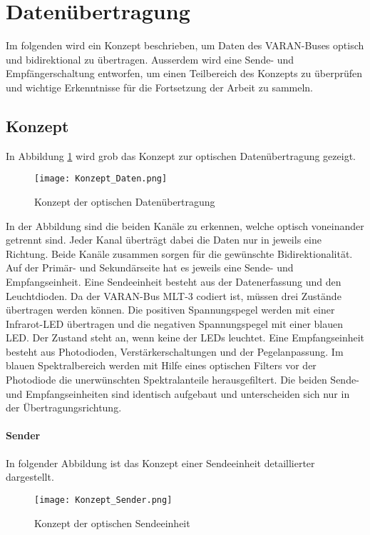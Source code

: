 \section{Datenübertragung}
\label{sec:Daten}
Im folgenden wird ein Konzept beschrieben, um Daten des VARAN-Buses optisch und bidirektional zu übertragen. Ausserdem wird eine Sende- und Empfängerschaltung entworfen, um einen Teilbereich des Konzepts zu überprüfen und wichtige Erkenntnisse für die Fortsetzung der Arbeit zu sammeln.  
\subsection{Konzept}
In Abbildung \ref{fig:Konzept_Daten} wird grob das Konzept zur optischen Datenübertragung gezeigt.

\begin{figure}[h]
	\centering
	\texttt{[image: Konzept\_Daten.png]}
	\caption{Konzept der optischen Datenübertragung}\label{fig:Konzept_Daten}
\end{figure}

In der Abbildung sind die beiden Kanäle zu erkennen, welche optisch voneinander getrennt sind. Jeder Kanal überträgt dabei die Daten nur in jeweils eine Richtung. Beide Kanäle zusammen sorgen für die gewünschte Bidirektionalität. Auf der Primär- und Sekundärseite hat es jeweils eine Sende- und Empfangseinheit. Eine Sendeeinheit besteht aus der Datenerfassung und den Leuchtdioden. Da der VARAN-Bus MLT-3 codiert ist, müssen drei Zustände übertragen werden können. Die positiven Spannungspegel werden mit einer Infrarot-LED übertragen und die negativen Spannungspegel mit einer blauen LED. Der Zustand \grqq steht an, wenn keine der LEDs leuchtet.
\newline
Eine Empfangseinheit besteht aus Photodioden, Verstärkerschaltungen und der Pegelanpassung. Im blauen Spektralbereich werden mit Hilfe eines optischen Filters vor der Photodiode die unerwünschten Spektralanteile herausgefiltert.
\newline Die beiden Sende- und Empfangseinheiten sind identisch aufgebaut und unterscheiden sich nur in der Übertragungsrichtung.

\paragraph{Sender}
In folgender Abbildung ist das Konzept einer Sendeeinheit detaillierter dargestellt.

\begin{figure}[H]
	\centering
	\texttt{[image: Konzept\_Sender.png]}
	\caption{Konzept der optischen Sendeeinheit}\label{fig:Konzept_Sender}
\end{figure}

